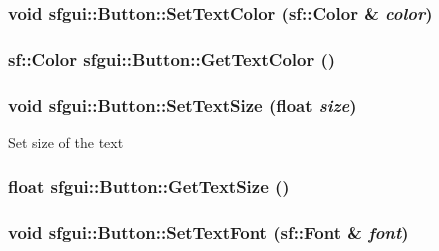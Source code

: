 \hypertarget{classsfgui_1_1Button_af73ff1983944ea0969bf5c7421725c5}{
\subsubsection[SetTextColor]{\setlength{\rightskip}{0pt plus 5cm}void sfgui::Button::SetTextColor (sf::Color \& {\em color})}}
\label{classsfgui_1_1Button_af73ff1983944ea0969bf5c7421725c5}


\hypertarget{classsfgui_1_1Button_7eca4b2322ce0785e64bd2932912b974}{
\subsubsection[GetTextColor]{\setlength{\rightskip}{0pt plus 5cm}sf::Color sfgui::Button::GetTextColor ()}}
\label{classsfgui_1_1Button_7eca4b2322ce0785e64bd2932912b974}


\hypertarget{classsfgui_1_1Button_eed26d1a50f825f24ef1f2a16ef0b425}{
\subsubsection[SetTextSize]{\setlength{\rightskip}{0pt plus 5cm}void sfgui::Button::SetTextSize (float {\em size})}}
\label{classsfgui_1_1Button_eed26d1a50f825f24ef1f2a16ef0b425}




Set size of the text \hypertarget{classsfgui_1_1Button_ed3a5fc8690d92ee59483b5dd7de6dbf}{
\subsubsection[GetTextSize]{\setlength{\rightskip}{0pt plus 5cm}float sfgui::Button::GetTextSize ()}}
\label{classsfgui_1_1Button_ed3a5fc8690d92ee59483b5dd7de6dbf}


\hypertarget{classsfgui_1_1Button_f1a92c908326f7bd9973da154854a8bd}{
\subsubsection[SetTextFont]{\setlength{\rightskip}{0pt plus 5cm}void sfgui::Button::SetTextFont (sf::Font \& {\em font})}}
\label{classsfgui_1_1Button_f1a92c908326f7bd9973da154854a8bd}


